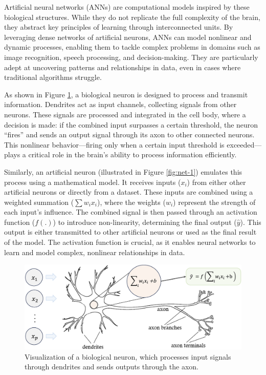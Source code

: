 \documentclass[
  11pt,
]{book}
\theoremstyle{definition}
\theoremstyle{definition}
\theoremstyle{definition}
\theoremstyle{definition}
\theoremstyle{remark}
\begin{document}
Artificial neural networks (ANNs) are computational models inspired by these biological structures. While they do not replicate the full complexity of the brain, they abstract key principles of learning through interconnected units. By leveraging dense networks of artificial neurons, ANNs can model nonlinear and dynamic processes, enabling them to tackle complex problems in domains such as image recognition, speech processing, and decision-making. They are particularly adept at uncovering patterns and relationships in data, even in cases where traditional algorithms struggle.

As shown in Figure \ref{fig:net-brain}, a biological neuron is designed to process and transmit information. Dendrites act as input channels, collecting signals from other neurons. These signals are processed and integrated in the cell body, where a decision is made: if the combined input surpasses a certain threshold, the neuron ``fires'' and sends an output signal through its axon to other connected neurons. This nonlinear behavior---firing only when a certain input threshold is exceeded---plays a critical role in the brain's ability to process information efficiently.

Similarly, an artificial neuron (illustrated in Figure \ref{fig:net-1}) emulates this process using a mathematical model. It receives inputs (\(x_i\)) from either other artificial neurons or directly from a dataset. These inputs are combined using a weighted summation (\(\sum w_i x_i\)), where the weights (\(w_i\)) represent the strength of each input's influence. The combined signal is then passed through an activation function (\(f(.)\)) to introduce non-linearity, determining the final output (\(\hat{y}\)). This output is either transmitted to other artificial neurons or used as the final result of the model. The activation function is crucial, as it enables neural networks to learn and model complex, nonlinear relationships in data.

\begin{figure}[H]

{\centering \includegraphics[width=0.75\linewidth]{images/ch12_net_brain} 

}

\caption{Visualization of a biological neuron, which processes input signals through dendrites and sends outputs through the axon.}\label{fig:net-brain}
\end{figure}
\end{document}
